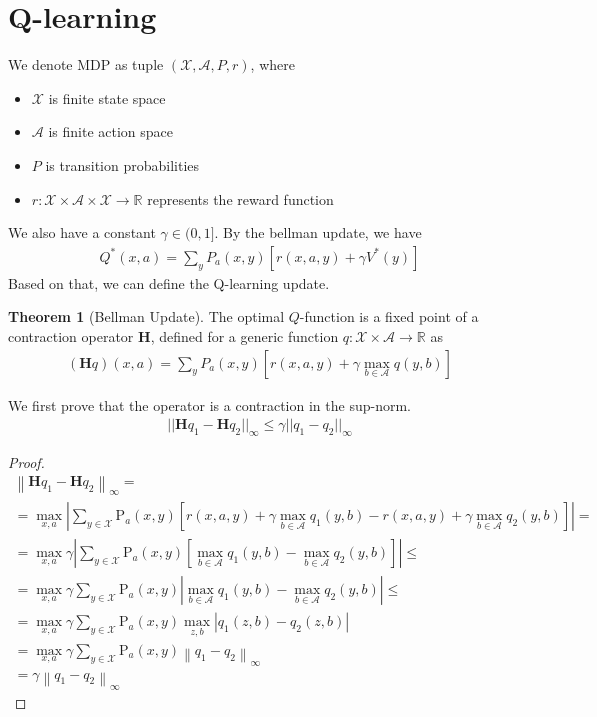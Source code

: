 \documentclass[a4paper]{article}
\theoremstyle{definition}
\newtheorem{theo}{Theorem}[section]
\begin{document}
\section{Q-learning}
We denote MDP as tuple $(\mathcal{X}, \mathcal{A}, P, r)$,
where
\begin{itemize}
\item $\mathcal{X}$ is finite state space
\item $\mathcal{A}$ is finite action space
\item $P$ is transition probabilities
\item $r: \mathcal{X} \times \mathcal{A} \times \mathcal{X} \rightarrow \mathbb{R}$ represents the reward function
\end{itemize}
We also have a constant $\gamma \in (0, 1]$.
By the bellman update, we have
\begin{align*}
Q^{*}(x,a) = \sum_{y}P_{a}(x, y)[r(x,a,y) + \gamma V^{*}(y)]
\end{align*}
Based on that, we can define the Q-learning update.
\begin{theo}[Bellman Update]
The optimal $Q$-function is a fixed point of a contraction operator $\mathbf{H}$, defined for a generic function $q: \mathcal{X} \times \mathcal{A} \rightarrow \mathbb{R}$ as
\begin{align*}
(\mathbf{H}q)(x,a) = \sum_{y}P_{a}(x, y)[r(x, a, y) + \gamma \max_{b \in \mathcal{A}}q(y, b)]
\end{align*}
\end{theo}
We first prove that the operator is a contraction in the sup-norm.
\begin{align*}
||\mathbf{H}q_1 - \mathbf{H}q_2||_{\infty}\leq \gamma ||q_1-q_2||_{\infty}
\end{align*}

\begin{proof}
\begin{equation}
\begin{array}{l}{\left\|\mathbf{H} q_{1}-\mathbf{H} q_{2}\right\|_{\infty}=} \\ {=\max _{x, a}\left|\sum_{y \in \mathcal{X}} \mathrm{P}_{a}(x, y)\left[r(x, a, y)+\gamma \max _{b \in \mathcal{A}} q_{1}(y, b)-r(x, a, y)+\gamma \max _{b \in \mathcal{A}} q_{2}(y, b)\right]\right|=} \\ {=\max _{x, a} \gamma\left|\sum_{y \in \mathcal{X}} \mathrm{P}_{a}(x, y)\left[\max _{b \in \mathcal{A}} q_{1}(y, b)-\max _{b \in \mathcal{A}} q_{2}(y, b)\right]\right| \leq} \\ {=\max _{x, a} \gamma \sum_{y \in \mathcal{X}} \mathrm{P}_{a}(x, y) |\max _{b \in \mathcal{A}} q_{1}(y, b)-\max _{b \in \mathcal{A}} q_{2}(y, b) | \leq} \\ {=\max _{x, a} \gamma \sum_{y \in \mathcal{X}} \mathrm{P}_{a}(x, y)\max_{z,b} | q_{1}(z, b)-q_{2}(z, b) |} \\ {=\max _{x, a} \gamma \sum_{y \in \mathcal{X}} \mathrm{P}_{a}(x, y)\left\|q_{1}-q_{2}\right\|_{\infty}} \\ {=\gamma\left\|q_{1}-q_{2}\right\|_{\infty}}\end{array}
\end{equation}
\end{proof}
\end{document}
